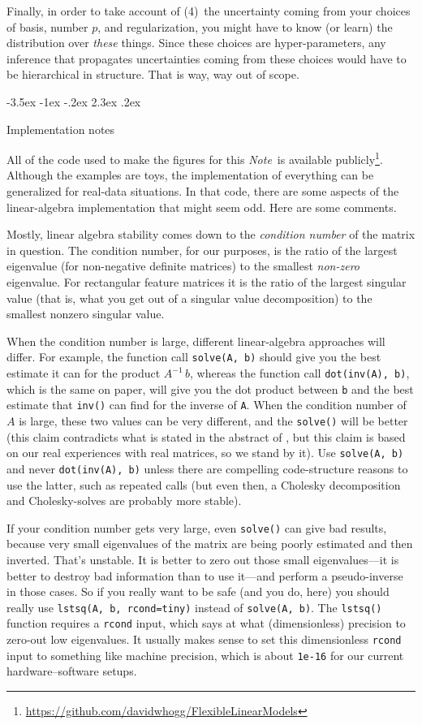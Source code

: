 \documentclass[12pt,letterpaper]{article}
\makeatletter
\renewcommand\section{\@startsection {section}{1}{\z@}%
  {-3.5ex \@plus -1ex \@minus -.2ex}%
  {2.3ex \@plus.2ex}%
  {\raggedright\normalfont\Large\bfseries}}
\newcommand{\documentname}{\textsl{Note}}
\newcommand{\code}[1]{\texttt{#1}}
\makeatother
\begin{document}
Finally, in order to take account of (4)~the uncertainty coming from your choices of basis, number $p$, and regularization, you might have to know (or learn) the distribution over \emph{these} things.
Since these choices are hyper-parameters, any inference that propagates uncertainties coming from these choices would have to be hierarchical in structure.
That is way, way out of scope.

\section{Implementation notes}\label{sec:implementation}

All of the code used to make the figures for this \documentname\ is available publicly\footnote{\url{https://github.com/davidwhogg/FlexibleLinearModels}}.
Although the examples are toys, the implementation of everything can be generalized for real-data situations.
In that code, there are some aspects of the linear-algebra implementation that might seem odd.
Here are some comments.

Mostly, linear algebra stability comes down to the \emph{condition number} of the matrix in question.
The condition number, for our purposes, is the ratio of the largest eigenvalue (for non-negative definite matrices) to the smallest \emph{non-zero} eigenvalue.
For rectangular feature matrices it is the ratio of the largest singular value (that is, what you get out of a singular value decomposition) to the smallest nonzero singular value.

When the condition number is large, different linear-algebra approaches will differ.
For example, the function call \code{solve(A, b)} should give you the best estimate it can for the product $A^{-1}\,b$, whereas the function call \code{dot(inv(A), b)}, which is the same on paper, will give you the dot product between \code{b} and the best estimate that \code{inv()} can find for the inverse of \code{A}.
When the condition number of $A$ is large, these two values can be very different, and the \code{solve()} will be better (this claim contradicts what is stated in the abstract of \citealt{solve}, but this claim is based on our real experiences with real matrices, so we stand by it).
Use \code{solve(A, b)} and never \code{dot(inv(A), b)} unless there are compelling code-structure reasons to use the latter, such as repeated calls (but even then, a Cholesky decomposition and Cholesky-solves are probably more stable).

If your condition number gets very large, even \code{solve()} can give bad results, because very small eigenvalues of the matrix are being poorly estimated and then inverted.
That's unstable.
It is better to zero out those small eigenvalues---it is better to destroy bad information than to use it---and perform a pseudo-inverse in those cases.
So if you really want to be safe (and you do, here) you should really use \code{lstsq(A, b, rcond=tiny)} instead of \code{solve(A, b)}.
The \code{lstsq()} function requires a \code{rcond} input, which says at what (dimensionless) precision to zero-out low eigenvalues.
It usually makes sense to set this dimensionless \code{rcond} input to something like machine precision, which is about \code{1e-16} for our current hardware--software setups.
\end{document}
